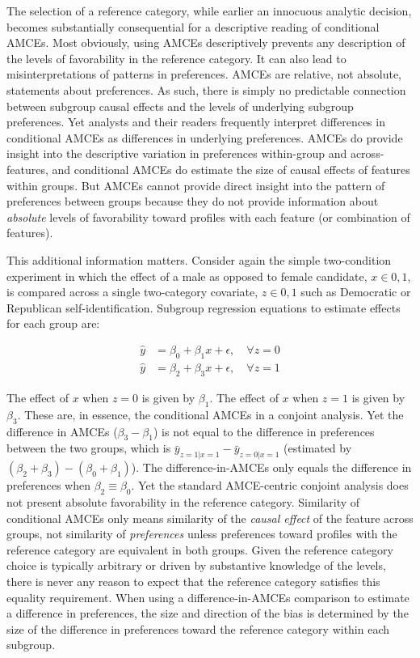 \documentclass[a4paper,12pt]{article}\usepackage[]{graphicx}\usepackage[]{color}
\begin{document}
The selection of a reference category, while earlier an innocuous analytic decision, becomes substantially consequential for a descriptive reading of conditional AMCEs. Most obviously, using AMCEs descriptively prevents any description of the levels of favorability in the reference category. It can also lead to misinterpretations of patterns in preferences. AMCEs are relative, not absolute, statements about preferences. As such, there is simply no predictable connection between subgroup causal effects and the levels of underlying subgroup preferences. Yet analysts and their readers frequently interpret differences in conditional AMCEs as differences in underlying preferences. AMCEs do provide insight into the descriptive variation in preferences within-group and across-features, and conditional AMCEs do estimate the size of causal effects of features within groups. But AMCEs cannot provide direct insight into the pattern of preferences between groups because they do not provide information about \textit{absolute} levels of favorability toward profiles with each feature (or combination of features).

This additional information matters. Consider again the simple two-condition experiment in which the effect of a male as opposed to female candidate, $x \in {0,1}$, is compared across a single two-category covariate, $z \in {0,1}$ such as Democratic or Republican self-identification. Subgroup regression equations to estimate effects for each group are:

\begin{align*}
\hat{y} &= \beta_0 + \beta_1 x + \epsilon, \quad \forall z = 0 \\
\hat{y} &= \beta_2 + \beta_3 x + \epsilon, \quad \forall z = 1
\end{align*}

\noindent The effect of $x$ when $z=0$ is given by $\beta_1$. The effect of $x$ when $z=1$ is given by $\beta_3$. These are, in essence, the conditional AMCEs in a conjoint analysis. Yet the difference in AMCEs ($\beta_3 - \beta_1$) is not equal to the difference in preferences between the two groups, which is $\bar{y}_{z=1|x=1} - \bar{y}_{z=0|x=1}$ (estimated by $(\beta_2 + \beta_3) - (\beta_0 + \beta_1)$). The difference-in-AMCEs only equals the difference in preferences when $\beta_2 \equiv \beta_0$. Yet the standard AMCE-centric conjoint analysis does not present absolute favorability in the reference category. Similarity of conditional AMCEs only means similarity of the \textit{causal effect} of the feature across groups, not similarity of \textit{preferences} unless preferences toward profiles with the reference category are equivalent in both groups. Given the reference category choice is typically arbitrary or driven by substantive knowledge of the levels, there is never any reason to expect that the reference category satisfies this equality requirement. When using a difference-in-AMCEs comparison to estimate a difference in preferences, the size and direction of the bias is determined by the size of the difference in preferences toward the reference category within each subgroup.
\end{document}

